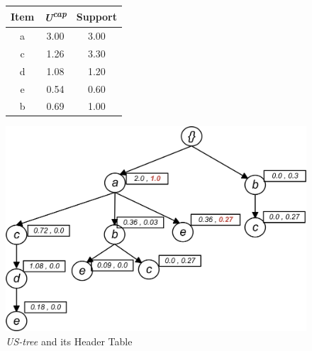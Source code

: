 %

\begin{figure}
\begin{minipage}{0.40\textwidth}
  \centering
  
	\begin{center}
	\begin{tabular}{ |c|c|c| } 
 	\hline
 		Item&\emph{U\textsuperscript{cap}}&Support\\ \hline\hline
 		a &  3.00  & 3.00	\\ \hline
 		c &  1.26  & 3.30	\\ \hline
 		d &  1.08  & 1.20	\\ \hline
 		e &  0.54  & 0.60	\\ \hline
 		b &  0.69  & 1.00	\\ \hline
\end{tabular}
\end{center}   
\end{minipage}
\hfill
\begin{minipage}{0.40\textwidth}
  \centering
  \includegraphics[width=\textwidth]{images/sim_06.jpg}
\end{minipage}
\caption{\emph{US-tree} and its Header Table}
\label{figure:min_before}
\end{figure}
